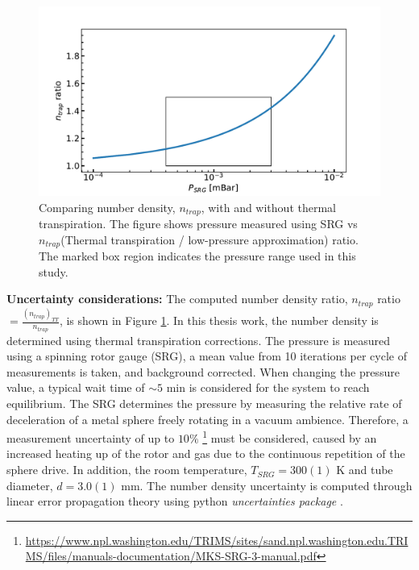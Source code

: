 % 
\begin{figure}[!htb]
    \centering
    \includegraphics[width=1\textwidth]{figures/measurements/kinetics/numberDensity_ratio.pdf}
    \caption{Comparing number density, $n_{trap}$, with and without thermal transpiration. The figure shows pressure measured using SRG vs $n_{trap}$(Thermal transpiration / low-pressure approximation) ratio. The marked box region indicates the pressure range used in this study.}
    \label{fig:number-density-compare}
\end{figure}

\textbf{Uncertainty considerations:} The computed number density ratio, $n_{trap}$ ratio $= \frac{\left( n_{trap}\right) _{TT}}{n_{trap}}$, is shown in Figure \ref{fig:number-density-compare}. In this thesis work, the number density is determined using thermal transpiration corrections. The pressure is measured using a spinning rotor gauge (SRG), a mean value from 10 iterations per cycle of measurements is taken, and background corrected. When changing the pressure value, a typical wait time of $\sim 5$ min is considered for the system to reach equilibrium. The SRG determines the pressure by measuring the relative rate of deceleration of a metal sphere freely rotating in a vacuum ambience. Therefore, a measurement uncertainty of up to $10 \%$ \footnote{\url{https://www.npl.washington.edu/TRIMS/sites/sand.npl.washington.edu.TRIMS/files/manuals-documentation/MKS-SRG-3-manual.pdf}} must be considered, caused by an increased heating up of the rotor and gas due to the continuous repetition of the sphere drive. In addition,  the room temperature, $T_{SRG}=300 (1)$ K and tube diameter, $d=3.0(1)$ mm. The number density uncertainty is computed through linear error propagation theory using python \textit{uncertainties package} \cite{lebigot_uncertainties_nodate}.

